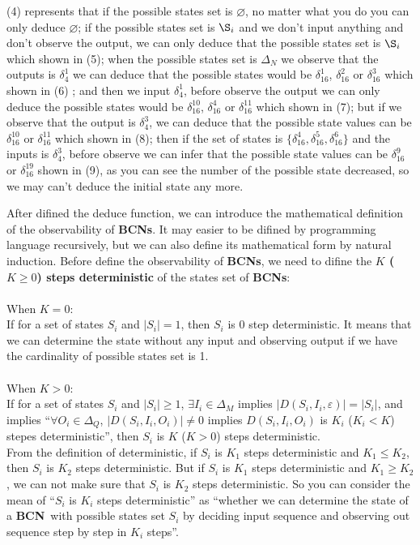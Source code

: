 \documentclass[letterpaper, 10 pt, conference]{ieeeconf}  %
\def \BCN {{\bf BCN}}
\begin{document}
(4) represents that if the possible states set is $\varnothing$, no matter what you do you can only deduce $\varnothing$; if the possible states set is $\S_i$ and we don't input anything and don't observe the output, we can only deduce that the possible states set is $\S_i$ which shown in (5); when the possible states set is $\Delta_N$ we observe that the outputs is $\delta_4^1$ we can deduce that the possible states would be $\delta_{16}^1$, $\delta_{16}^2$ or  $\delta_{16}^3$ which shown in (6) ; and then we input $\delta_4^1$, before observe the output we can only deduce the possible states would be   $\delta_{16}^{10}$, $\delta_{16}^4$ or  $\delta_{16}^{11}$ which shown in (7); but if we observe that the output is $\delta_4^3$, we can deduce that the possible state values can be $\delta_{16}^{10}$ or  $\delta_{16}^{11}$ which shown in (8); then if the set of states is $\{\delta_{16}^4,\delta_{16}^5,\delta_{16}^6\}$ and the inputs is $\delta_4^3$, before observe we can infer that the possible state values can be $\delta_{16}^9$ or  $\delta_{16}^{19}$ shown in (9), as you can see the number of the possible state decreased, so we may can't deduce the initial state any more. 

After difined the deduce function, we can introduce the mathematical definition of the observability of {\bf BCNs}. It may easier to be difined by programming language recursively, but we can also define its mathematical form by natural induction. Before define the observability of {\bf BCNs}, we need to difine the  {\bf  $K$ ($K\ge0$) steps deterministic} of the states set of {\bf BCNs}:\\
\\
When $K=0$:\\
 If for a set of states $S_i$ and $|S_i|=1$, then $S_i$ is $0$ step deterministic. It means that we can determine the state without any input and observing output if we have the cardinality of possible states set is 1.\\
\\
When $K>0$:\\
 If for a set of states $S_i$ and $|S_i|\ge1$, $\exists I_i \in \Delta_M$ implies $|D\left(S_i,I_i,\varepsilon\right)|=|S_i|$, and implies ``$\forall O_i\in \Delta_Q$, $|D\left(S_i,I_i,O_i\right)|\neq 0$ implies $D\left(S_i,I_i,O_i\right)$ is $K_i$ ($K_i<K$) stepes deterministic'', then $S_i$ is $K$ ($K>0$) steps deterministic.\\

From the definition of deterministic, if $S_i$ is $K_1$ steps deterministic and $K_1\leq K_2$, then $S_i$ is $K_2$ steps deterministic. But if $S_i$ is $K_1$ steps deterministic and $K_1\geq K_2$, we can not make sure that $S_i$ is $K_2$ steps deterministic. So you can consider the mean of ``$S_i$ is $K_i$ steps deterministic'' as ``whether we can determine the state of a \BCN\ with possible states set $S_i$ by deciding input sequence and observing out sequence step by step in $K_i$ steps''.\\
\end{document}
